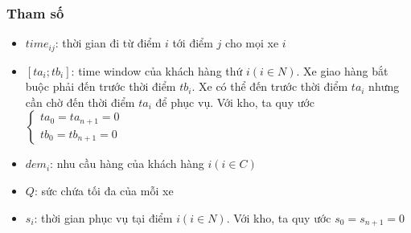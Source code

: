 \documentclass[12pt,a4paper]{article}\author{Nguyễn Nho Dũng}
\newcommand{\doan}[2]{\left[#1;#2\right]}
\begin{document}
\subsubsection*{Tham số}
\begin{itemize}
	\item $time_{ij}$: thời gian đi từ điểm $i$ tới điểm $j$ cho mọi xe $i$
	\item $\doan{ta_i}{tb_i}$: time window của khách hàng thứ $i (i\in N)$. Xe giao hàng bắt buộc phải đến trước thời điểm $tb_i$. Xe có thể đến trước thời điểm $ta_i$ nhưng cần chờ đến thời điểm $ta_i$ để phục vụ. Với kho, ta quy ước $\begin{cases}
		ta_0 = ta_{n+1} = 0\\
		tb_0 = tb_{n+1} = 0
	\end{cases}$
	\item $dem_i$: nhu cầu hàng của khách hàng $i (i\in C)$
	\item $Q$: sức chứa tối đa của mỗi xe
	\item $s_i$: thời gian phục vụ tại điểm $i (i\in N)$. Với kho, ta quy ước $s_0 = s_{n+1} = 0$
\end{itemize}
\end{document}

